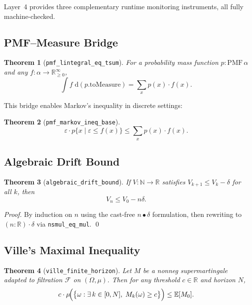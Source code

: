 \documentclass[11pt,a4paper,twocolumn]{article}
\newtheorem{theorem}{Theorem}[section]
\theoremstyle{definition}
\theoremstyle{remark}
\newcommand{\E}{\mathbb{E}}
\newcommand{\R}{\mathbb{R}}
\newcommand{\N}{\mathbb{N}}
\newcommand{\leancode}[1]{\texttt{\color{leanblue}#1}}
\begin{document}
Layer~4 provides three complementary runtime monitoring instruments, all
fully machine-checked.

\subsection{PMF--Measure Bridge}

\begin{theorem}[\leancode{pmf\_lintegral\_eq\_tsum}]
\label{thm:bridge-pmf}
For a probability mass function $p : \mathrm{PMF}\,\alpha$ and any
$f : \alpha \to \R_{\geq 0}^\infty$,
\begin{equation}
  \int f\;\mathrm{d}(p.\mathrm{toMeasure})
  = \sum_{x} p(x) \cdot f(x).
\end{equation}
\end{theorem}

This bridge enables Markov's inequality in discrete settings:

\begin{theorem}[\leancode{pmf\_markov\_ineq\_base}]
\label{thm:markov}
\begin{equation}
  \varepsilon \cdot p\{x \mid \varepsilon \leq f(x)\}
  \leq \sum_{x} p(x) \cdot f(x).
\end{equation}
\end{theorem}

\subsection{Algebraic Drift Bound}

\begin{theorem}[\leancode{algebraic\_drift\_bound}]
\label{thm:drift}
If $V : \N \to \R$ satisfies $V_{k+1} \leq V_k - \delta$ for all $k$, then
\begin{equation}
  V_n \leq V_0 - n\delta.
\end{equation}
\end{theorem}

\begin{proof}
By induction on $n$ using the cast-free $n \bullet \delta$ formulation,
then rewriting to $(n:\R)\cdot\delta$ via \leancode{nsmul\_eq\_mul}. \qed
\end{proof}

\subsection{Ville's Maximal Inequality}

\begin{theorem}[\leancode{ville\_finite\_horizon}]
\label{thm:ville}
Let $M$ be a nonneg supermartingale adapted to filtration $\mathcal{F}$
on $(\Omega, \mu)$. Then for any threshold $c \in \R$ and horizon $N$,
\begin{equation}
  c \cdot \mu\!\Bigl(\bigl\{\omega :
    \exists\, k \in [0, N],\; M_k(\omega) \geq c\bigr\}\Bigr)
  \leq \E[M_0].
  \label{eq:ville}
\end{equation}
\end{theorem}
\end{document}
